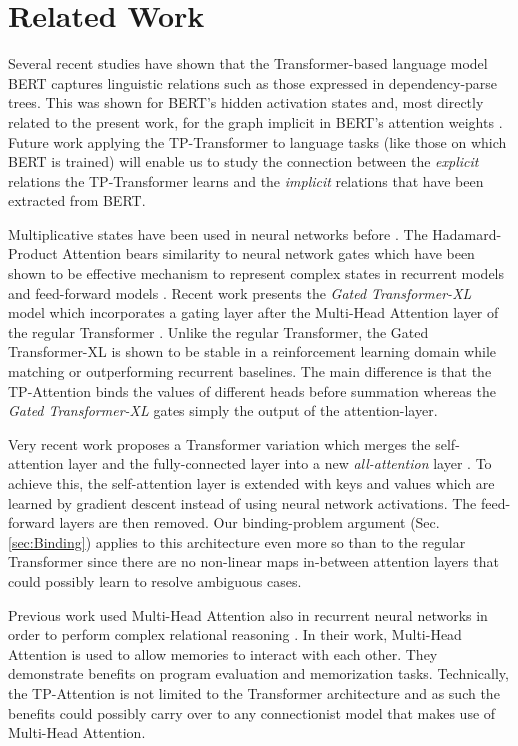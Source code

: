 \documentclass[11pt,a4paper]{article}
\newcommand{\ischl}[1]{{#1}}
\begin{document}
\section{Related Work}  \label{sec:Related}
Several recent studies have shown that the Transformer-based language model BERT \citep{devlin2018bert} captures linguistic relations such as those expressed in dependency-parse trees. 
This was shown for BERT's hidden activation states \citep{hewitt2019structural, tenney2019bert} and, most directly related to the present work, for the graph implicit in BERT's attention weights \citep{coenen2019visualizing, lin2019open}.
Future work applying the TP-Transformer to language tasks (like those on which BERT is trained) will enable us to study the connection between the \textit{explicit} relations  the TP-Transformer learns and the \textit{implicit} relations that have been extracted from BERT.

\ischl{
Multiplicative states have been used in neural networks before \cite{ivakhnenko1965, ivakhnenko1971}.
The Hadamard-Product Attention bears similarity to neural network gates which have been shown to be effective mechanism to represent complex states in recurrent models \cite{Hochreiter:97lstm} and feed-forward models \cite{greff2015nips}. 
Recent work presents the \textit{Gated Transformer-XL} model which incorporates a gating layer after the Multi-Head Attention layer of the regular Transformer \cite{parisotto2019stabilizing}. 
Unlike the regular Transformer, the Gated Transformer-XL is shown to be stable in a reinforcement learning domain while matching or outperforming recurrent baselines.
The main difference is that the TP-Attention binds the values of different heads before summation whereas the \textit{Gated Transformer-XL} gates simply the output of the attention-layer.

Very recent work proposes a Transformer variation which merges the self-attention layer and the fully-connected layer into a new \textit{all-attention} layer \cite{sukhbaatar2019augmenting}. 
To achieve this, the self-attention layer is extended with keys and values which are learned by gradient descent instead of using neural network activations. 
The feed-forward layers are then removed. 
Our binding-problem argument (Sec. \ref{sec:Binding}) applies to this architecture even more so than to the regular Transformer since there are no non-linear maps in-between attention layers that could possibly learn to resolve ambiguous cases.

Previous work used Multi-Head Attention also in recurrent neural networks in order to perform complex relational reasoning \cite{santoro2018relational}. In their work, Multi-Head Attention is used to allow memories to interact with each other. They demonstrate benefits on program evaluation and memorization tasks. Technically, the TP-Attention is not limited to the Transformer architecture and as such the benefits could possibly carry over to any connectionist model that makes use of Multi-Head Attention. 
}
\end{document}
